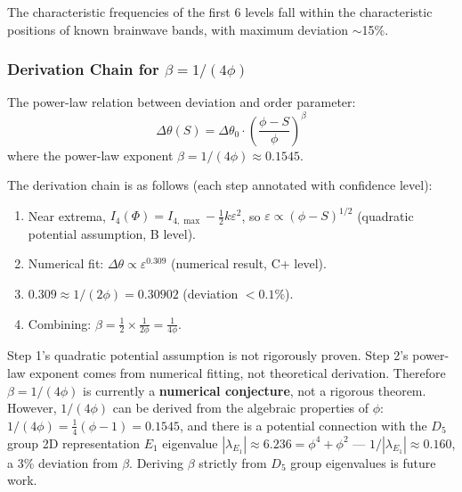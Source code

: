 The characteristic frequencies of the first 6 levels fall within the characteristic positions of known brainwave bands, with maximum deviation $\sim$15\%.

\subsubsection{Derivation Chain for $\beta = 1/(4\phi)$}

\begin{conjecture}
\label{conj:beta_en}
The power-law relation between deviation and order parameter:
\begin{equation}
\Delta\theta(S) = \Delta\theta_0 \cdot \left(\frac{\phi - S}{\phi}\right)^{\beta}
\label{eq:beta_scaling_en}
\end{equation}
where the power-law exponent $\beta = 1/(4\phi) \approx 0.1545$.
\end{conjecture}

The derivation chain is as follows (each step annotated with confidence level):
\begin{enumerate}
\item Near extrema, $I_4(\Phi) = I_{4,\max} - \frac{1}{2}k\varepsilon^2$, so $\varepsilon \propto (\phi - S)^{1/2}$ (quadratic potential assumption, B level).
\item Numerical fit: $\Delta\theta \propto \varepsilon^{0.309}$ (numerical result, C+ level).
\item $0.309 \approx 1/(2\phi) = 0.30902$ (deviation $<0.1\%$).
\item Combining: $\beta = \frac{1}{2} \times \frac{1}{2\phi} = \frac{1}{4\phi}$.
\end{enumerate}

\begin{remark}
Step 1's quadratic potential assumption is not rigorously proven. Step 2's power-law exponent comes from numerical fitting, not theoretical derivation. Therefore $\beta = 1/(4\phi)$ is currently a \textbf{numerical conjecture}, not a rigorous theorem. However, $1/(4\phi)$ can be derived from the algebraic properties of $\phi$: $1/(4\phi) = \frac{1}{4}(\phi - 1) = 0.1545$, and there is a potential connection with the $D_5$ group 2D representation $E_1$ eigenvalue $|\lambda_{E_1}| \approx 6.236 = \phi^4 + \phi^2$ --- $1/|\lambda_{E_1}| \approx 0.160$, a 3\% deviation from $\beta$. Deriving $\beta$ strictly from $D_5$ group eigenvalues is future work.
\end{remark}

